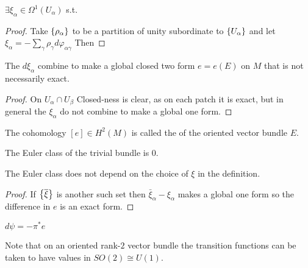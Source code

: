 \documentclass{article}
\begin{document}
\begin{lemma}
	$\exists \xi_\alpha \in \Omega^1(U_\alpha)$ s.t. 
\end{lemma}
\begin{proof}
	Take $\left\{ \rho_\alpha \right\}$ to be a partition of unity subordinate to $\left\{ U_\alpha \right\}$ and let $
	\xi_\alpha = -\sum_\gamma \rho_\gamma d\varphi_{\alpha\gamma}	$
	Then 
\end{proof}

\begin{lemma}
	The $d\xi_\alpha$ combine to make a global closed two form $e=e(E)$ on $M$ that is not necessarily exact. 
\end{lemma}
\begin{proof}
	On $U_\alpha \cap U_\beta$ 
	Closed-ness is clear, as on each patch it is exact, but in general the $\xi_\alpha$ do not combine to make a global one form. 
\end{proof}

\begin{definition}
	The cohomology $[e] \in H^2(M)$ is called the  of the oriented vector bundle $E$. 
\end{definition}

\begin{example}
	The Euler class of the trivial bundle is 0.
\end{example}

\begin{prop}
	The Euler class does not depend on the choice of $\xi$ in the definition. 
\end{prop}
\begin{proof}
	If $\left\{ \overline{\xi} \right\}$ is another such set then $\bar{\xi}_\alpha - \xi_\alpha$ makes a global one form so the difference in $e$ is an exact form. 
\end{proof}

\begin{prop}
	$d\psi = -\pi^\ast e$
\end{prop}

\begin{remark}
	Note that on an oriented rank-$2$ vector bundle the transition functions can be taken to have values in $SO(2) \cong U(1)$. 
\end{remark}
\end{document}
